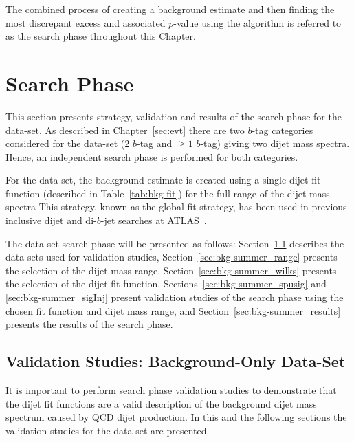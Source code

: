 The combined process of creating a background estimate and then
finding the most discrepant excess and associated $p$-value using the \bh{} algorithm
is referred to as the search phase throughout this Chapter.

\clearpage
\section{\summer{} Search Phase}
\label{sec:bkg-summer}

This section presents strategy, validation and results of the search phase for the \summer{} data-set.
As described in Chapter~\ref{sec:evt}
there are two $b$-tag categories considered for the \summer{} data-set 
(2 $b$-tag and $\geq1$ $b$-tag) giving two dijet mass spectra.
Hence, an independent search phase is performed for both categories.

For the \summer{} data-set, the background estimate is created using
a single dijet fit function (described in Table~\ref{tab:bkg-fit})
for the full range of the dijet mass spectra
This strategy, known as the global fit strategy,
has been used in previous inclusive dijet and di-$b$-jet
searches at ATLAS~\cite{dijet-mori16_paper,dibjet-mori16_paper}.

The \summer{} data-set search phase will be presented as follows:
Section~\ref{sec:bkg-summer_fitCR} describes the data-sets used for validation studies,
Section~\ref{sec:bkg-summer_range} presents the selection of the dijet mass range,
Section~\ref{sec:bkg-summer_wilks} presents the selection of the dijet fit function,
Sections~\ref{sec:bkg-summer_spusig} and \ref{sec:bkg-summer_sigInj} present validation studies of the search phase using the chosen fit function and dijet mass range,
and Section~\ref{sec:bkg-summer_results} presents the results of the search phase.




\subsection{Validation Studies: Background-Only Data-Set}
\label{sec:bkg-summer_fitCR}

It is important to perform search phase validation studies to demonstrate
that the dijet fit functions are a valid description of the background dijet mass spectrum caused by QCD dijet production.
In this and the following sections the validation studies for the \summer{} data-set are presented.


